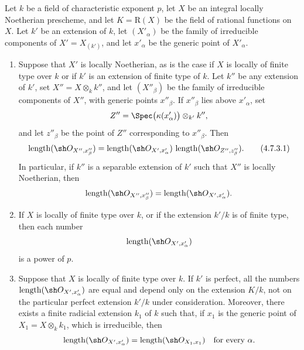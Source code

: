 \begin{proposition}[4.7.3]
\label{IV.4.7.3}
Let $k$ be a field of characteristic exponent $p$, let $X$ be an
integral locally Noetherian prescheme, and let
$K=\mathrm R(X)$ be the field of rational functions on $X$.
Let $k'$ be an extension of $k$, let $(X'_\alpha)$ be the family of
irreducible components of $X'=X_{(k')}$, and let $x'_\alpha$ be the
generic point of $X'_\alpha$.
\begin{enumerate}
\item[\rm(i)]
\label{IV.4.7.3.i}
Suppose that $X'$ is locally Noetherian, as is the case if $X$ is
locally of finite type over $k$ or if $k'$ is an extension of finite
type of $k$.
Let $k''$ be any extension of $k'$, set
$X''=X\otimes_k k''$, and let $(X''_\beta)$ be the family of
irreducible components of $X''$, with generic points $x''_\beta$.
If $x''_\beta$ lies above $x'_\alpha$, set
\[
 Z''=\Spec\bigl(\kappa(x'_\alpha)\bigr)\otimes_{k'}k'',
\]
and let $z''_\beta$ be the point of $Z''$ corresponding to
$x''_\beta$.
Then
\begin{equation}
\operatorname{length}(\sh O_{X'',x''_\beta})
=
\operatorname{length}(\sh O_{X',x'_\alpha})\,
\operatorname{length}(\sh O_{Z'',z''_\beta}).
\tag{4.7.3.1}
\label{IV.4.7.3.1}
\end{equation}
In particular, if $k''$ is a separable extension of $k'$ such that
$X''$ is locally Noetherian, then
\[
\operatorname{length}(\sh O_{X'',x''_\beta})
=\operatorname{length}(\sh O_{X',x'_\alpha}).
\]

\item[\rm(ii)]
\label{IV.4.7.3.ii}
If $X$ is locally of finite type over $k$, or if the extension $k'/k$
is of finite type, then each number
\[
\operatorname{length}(\sh O_{X',x'_\alpha})
\]
is a power of $p$.

\item[\rm(iii)]
\label{IV.4.7.3.iii}
Suppose that $X$ is locally of finite type over $k$.
If $k'$ is perfect, all the numbers
$\operatorname{length}(\sh O_{X',x'_\alpha})$ are equal and depend
only on the extension $K/k$, not on the particular perfect extension
$k'/k$ under consideration.
Moreover, there exists a finite radicial extension $k_1$ of $k$ such
that, if $x_1$ is the generic point of
$X_1=X\otimes_k k_1$, which is irreducible, then
\[
\operatorname{length}(\sh O_{X',x'_\alpha})
=\operatorname{length}(\sh O_{X_1,x_1})
\quad\text{for every }\alpha.
\]
\end{enumerate}
\end{proposition}


